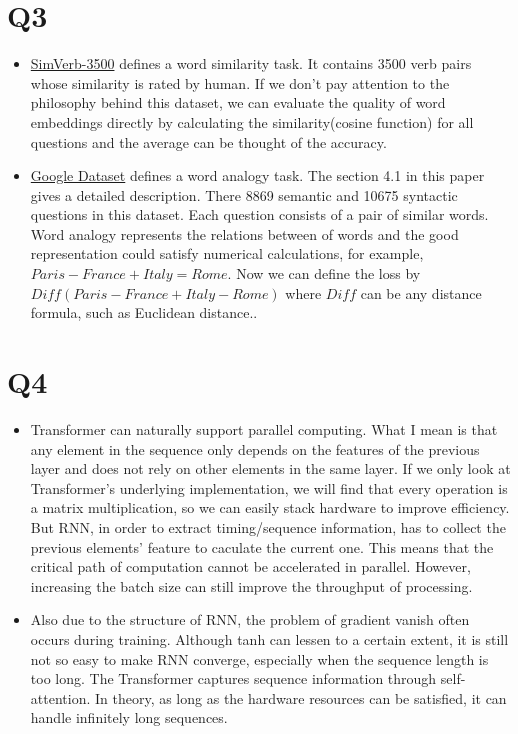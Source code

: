 \documentclass{article}
\begin{document}
\section*{Q3}
\begin{itemize}
  \item \href{https://arxiv.org/pdf/1608.00869.pdf}{SimVerb-3500} defines a word similarity task. It contains 3500 verb pairs whose similarity is rated by human. If we don’t pay attention to the philosophy behind this dataset, we can evaluate the quality of word embeddings directly by calculating the similarity(cosine function) for all questions and the average can be thought of the accuracy.
  \item \href{https://arxiv.org/pdf/1301.3781.pdf}{Google Dataset} defines a word analogy task. The section 4.1 in this paper gives a detailed description. There 8869 semantic and 10675 syntactic questions in this dataset. Each question consists of a pair of similar words.  Word analogy represents the relations between of words and the good representation could satisfy numerical calculations, for example, $Paris - France + Italy = Rome$. Now we can define the loss by $Diff(Paris - France + Italy - Rome)$ where $Diff$ can be any distance formula, such as Euclidean distance..
\end{itemize}

\section*{Q4}
\begin{itemize}
  \item Transformer can naturally support parallel computing. What I mean is that any element in the sequence only depends on the features of the previous layer and does not rely on other elements in the same layer. If we only look at Transformer's underlying implementation, we will find that every operation is a matrix multiplication, so we can easily stack hardware to improve efficiency. But RNN, in order to extract timing/sequence information, has to collect the previous elements' feature to caculate the current one. This means that the critical path of computation cannot be accelerated in parallel. However, increasing the batch size can still improve the throughput of processing.
  \item Also due to the structure of RNN, the problem of gradient vanish often occurs during training. Although tanh can lessen to a certain extent, it is still not so easy to make RNN converge, especially when the sequence length is too long. The Transformer captures sequence information through self-attention. In theory, as long as the hardware resources can be satisfied, it can handle infinitely long sequences.
\end{itemize}
\end{document}
